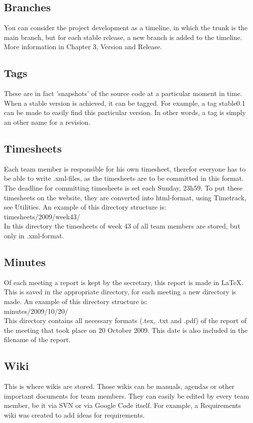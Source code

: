 \subsection{Branches}
You can consider the project development as a timeline, in which the trunk is the main branch, but for each stable release, a new branch is added to the timeline.
More information in Chapter 3, Version and Release.

\subsection{Tags}
These are in fact 'snapshots' of the source code at a particular moment in time.
When a stable version is achieved, it can be tagged.
For example, a tag stable0.1 can be made to easily find this particular version.
In other words, a tag is simply an other name for a revision.

\subsection{Timesheets}
Each team member is responsible for his own timesheet, therefor everyone has to be able to write .xml-files, as the timesheets are to be committed in this format.
The deadline for committing timesheets is set each Sunday, 23h59.
To put these timesheets on the website, they are converted into html-format, using Timetrack, see Utilities.
An example of this directory structure is:\\
timesheets/2009/week43/\\
In this directory the timesheets of week 43 of all team members are stored, but only in .xml-format.

\subsection{Minutes}
Of each meeting a report is kept by the secretary, this report is made in LaTeX.
This is saved in the appropriate directory, for each meeting a new directory is made.
An example of this directory structure is:\\
minutes/2009/10/20/\\
This directory contains all necessary formats (.tex, .txt and .pdf) of the report of the meeting that took place on 20 October 2009.
This date is also included in the filename of the report.

\subsection{Wiki}
This is where wikis are stored.
Those wikis can be manuals, agendas or other important documents for team members.
They can easily be edited by every team member, be it via SVN or via Google Code itself.
For example, a Requirements wiki was created to add ideas for requirements.

